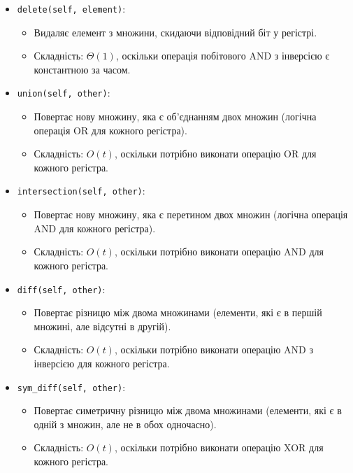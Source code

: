 \documentclass[a4paper,12pt]{article}
\begin{document}
\begin{itemize}
    \item \texttt{delete(self, element)}:
    \begin{itemize}
        \item Видаляє елемент з множини, скидаючи відповідний біт у регістрі.
        \item Складність: $\Theta(1)$, оскільки операція побітового AND з інверсією є константною за часом.
    \end{itemize}

    \item \texttt{union(self, other)}:
    \begin{itemize}
        \item Повертає нову множину, яка є об'єднанням двох множин (логічна операція OR для кожного регістра).
        \item Складність: $O(t)$, оскільки потрібно виконати операцію OR для кожного регістра.
    \end{itemize}

    \item \texttt{intersection(self, other)}:
    \begin{itemize}
        \item Повертає нову множину, яка є перетином двох множин (логічна операція AND для кожного регістра).
        \item Складність: $O(t)$, оскільки потрібно виконати операцію AND для кожного регістра.
    \end{itemize}

    \item \texttt{diff(self, other)}:
    \begin{itemize}
        \item Повертає різницю між двома множинами (елементи, які є в першій множині, але відсутні в другій).
        \item Складність: $O(t)$, оскільки потрібно виконати операцію AND з інверсією для кожного регістра.
    \end{itemize}

    \item \texttt{sym\_diff(self, other)}:
    \begin{itemize}
        \item Повертає симетричну різницю між двома множинами (елементи, які є в одній з множин, але не в обох одночасно).
        \item Складність: $O(t)$, оскільки потрібно виконати операцію XOR для кожного регістра.
    \end{itemize}


\end{itemize}
\end{document}
